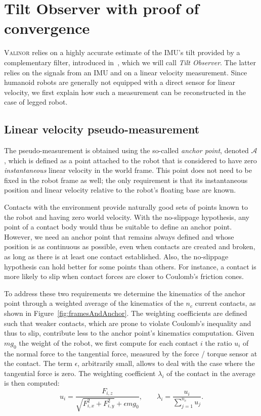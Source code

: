 \documentclass{IJCAS}
\begin{document}
\section{Tilt Observer with proof of convergence}
\label{sec:tilt_observer}
{\scshape{Valinor}} relies on a highly accurate estimate of the IMU's tilt provided by a complementary filter, introduced in~\cite{benallegue2020LyapunovStableOrientationEstimatorHumanoids}, which we will call \emph{Tilt Observer}. The latter relies on the signals from an IMU and on a linear velocity measurement. Since humanoid robots are generally not equipped with a direct sensor for linear velocity, we first explain how such a measurement can be reconstructed in the case of legged robot.

\subsection{Linear velocity pseudo-measurement}\label{sec:anchor_point}
The pseudo-measurement is obtained using the so-called \emph{anchor point}, denoted $\mathcal{A}$, which is defined as a point attached to the robot that is considered to have zero \emph{instantaneous} linear velocity in the world frame. This point does not need to be fixed in the robot frame as well; the only requirement is that its instantaneous position and linear velocity relative to the robot's floating base are known. 

Contacts with the environment provide naturally good sets of points known to the robot and having zero world velocity. With the no-slippage hypothesis, any point of a contact body would thus be suitable to define an anchor point. However, we need an anchor point that remains always defined and whose position is as continuous as possible, even when contacts are created and broken, as long as there is at least one contact established. Also, the no-slippage hypothesis can hold better for some points than others. For instance, a contact is more likely to slip when contact forces are closer to Coulomb's friction cones.

To address these two requirements we determine the kinematics of the anchor point through a weighted average of the kinematics of the $n_{c}$ current contacts, as shown in Figure~\ref{fig:framesAndAnchor}.  
The weighting coefficients are defined such that weaker contacts, which are prone to violate Coulomb's inequality and thus to slip, contribute less to the anchor point's kinematics computation. Given $mg_{0}$ the weight of the robot, we first compute for each contact $i$ the ratio $u_{i}$ of the normal force to the tangential force, measured by the force / torque sensor at the contact. The term $\epsilon$, arbitrarily small, allows to deal with the case where the tangential force is zero. The weighting coefficient $\lambda_{i}$ of the contact in the average is then computed:
\begin{equation}
    u_{i} = \frac{F_{i,z}}{\sqrt{F_{i,x}^2 + F_{i,y}^2} + \epsilon mg_{0}}, \qquad \lambda_{i}=\frac{u_{i}}{\sum^{n_{c}}_{j=1}u_{j}}. \label{eq:ratio_ui}
\end{equation}
\end{document}
